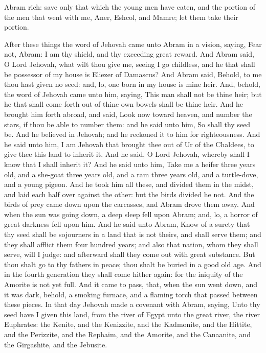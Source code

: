 Abram rich: save only that which the young men have eaten, and the portion of the men that went with me, Aner, Eshcol, and Mamre; let them take their portion. 

After these things the word of Jehovah came unto Abram in a vision, saying, Fear not, Abram: I am thy shield, and thy exceeding great reward. And Abram said, O Lord Jehovah, what wilt thou give me, seeing I go childless, and he that shall be possessor of my house is Eliezer of Damascus? And Abram said, Behold, to me thou hast given no seed: and, lo, one born in my house is mine heir. And, behold, the word of Jehovah came unto him, saying, This man shall not be thine heir; but he that shall come forth out of thine own bowels shall be thine heir. And he brought him forth abroad, and said, Look now toward heaven, and number the stars, if thou be able to number them: and he said unto him, So shall thy seed be. And he believed in Jehovah; and he reckoned it to him for righteousness. And he said unto him, I am Jehovah that brought thee out of Ur of the Chaldees, to give thee this land to inherit it. And he said, O Lord Jehovah, whereby shall I know that I shall inherit it? And he said unto him, Take me a heifer three years old, and a she-goat three years old, and a ram three years old, and a turtle-dove, and a young pigeon. And he took him all these, and divided them in the midst, and laid each half over against the other: but the birds divided he not. And the birds of prey came down upon the carcasses, and Abram drove them away.  And when the sun was going down, a deep sleep fell upon Abram; and, lo, a horror of great darkness fell upon him. And he said unto Abram, Know of a surety that thy seed shall be sojourners in a land that is not theirs, and shall serve them; and they shall afflict them four hundred years; and also that nation, whom they shall serve, will I judge: and afterward shall they come out with great substance. But thou shalt go to thy fathers in peace; thou shalt be buried in a good old age. And in the fourth generation they shall come hither again: for the iniquity of the Amorite is not yet full. And it came to pass, that, when the sun went down, and it was dark, behold, a smoking furnace, and a flaming torch that passed between these pieces. In that day Jehovah made a covenant with Abram, saying, Unto thy seed have I given this land, from the river of Egypt unto the great river, the river Euphrates: the Kenite, and the Kenizzite, and the Kadmonite, and the Hittite, and the Perizzite, and the Rephaim, and the Amorite, and the Canaanite, and the Girgashite, and the Jebusite. 

